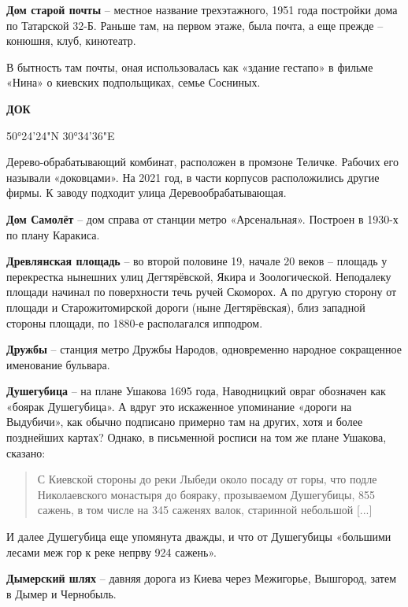 \medskip

\textbf{Дом старой почты} – местное название трехэтажного, 1951 года постройки дома по Татарской 32-Б. Раньше там, на первом этаже, была почта, а еще прежде – конюшня, клуб, кинотеатр.

В бытность там почты, оная использовалась как «здание гестапо» в фильме «Нина» о киевских подпольщиках, семье Сосниных.\\

\medskip

\textbf{ДОК}

50°24'24"N 30°34'36"E

Дерево-обрабатывающий комбинат, расположен в промзоне Теличке. Рабочих его называли «доковцами». На 2021 год, в части корпусов расположились другие фирмы. К заводу подходит улица Деревообрабатывающая.\\

\medskip

\textbf{Дом Самолёт} – дом справа от станции метро «Арсенальная». Построен в 1930-х по плану Каракиса.\\

\medskip

\textbf{Древлянская площадь} – во второй половине 19, начале 20 веков – площадь у перекрестка нынешних улиц Дегтярёвской, Якира и Зоологической. Неподалеку площади начинал по поверхности течь ручей Скоморох. А по другую сторону от площади и Старожитомирской дороги (ныне Дегтярёвская), близ западной стороны площади, по 1880-е располагался ипподром.\\

\newpage

\textbf{Дружбы} – станция метро Дружбы Народов, одновременно народное сокращенное именование бульвара.\\

\medskip

\textbf{Душегубица} – на плане Ушакова 1695 года, Наводницкий овраг обозначен как «боярак Душегубица». А вдруг это искаженное упоминание «дороги на Выдубичи», как обычно подписано примерно там на других, хотя и более позднейших картах? Однако, в письменной росписи на том же плане Ушакова, сказано:

\begin{quotation}
С Киевской стороны до реки Лыбеди около посаду от горы, что подле Николаевского монастыря до бояраку, прозываемом Душегубицы, 855 сажень, в том числе на 345 саженях валок, старинной небольшой [...]\end{quotation}

И далее Душегубица еще упомянута дважды, и что от Душегубицы «большими лесами меж гор к реке непрву 924 сажень».\\

\medskip

\textbf{Дымерский шлях} – давняя дорога из Киева через Межигорье, Вышгород, затем в Дымер и Чернобыль.

